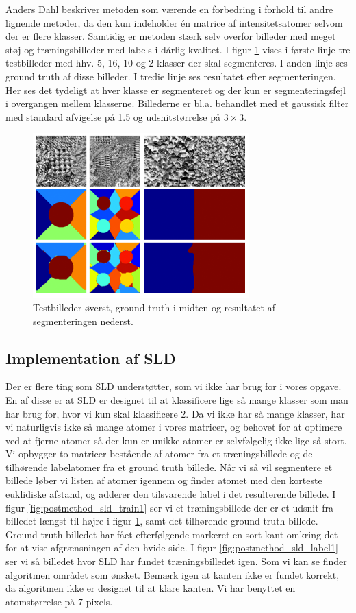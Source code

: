 Anders Dahl beskriver metoden som værende en forbedring i forhold til andre lignende metoder, da den kun indeholder én matrice af intensitetsatomer selvom der er flere klasser. Samtidig er metoden stærk selv overfor billeder med meget støj og træningsbilleder med labels i dårlig kvalitet. I figur \ref{fig:postmethod_sld_testing} vises i første linje tre testbilleder med hhv. 5, 16, 10 og 2 klasser der skal segmenteres. I anden linje ses ground truth af disse billeder. I tredie linje ses resultatet efter segmenteringen. Her ses det tydeligt at hver klasse er segmenteret og der kun er segmenteringsfejl i overgangen mellem klasserne. Billederne er bl.a. behandlet med et gaussisk filter med standard afvigelse på 1.5 og udsnitstørrelse på $3\times3$.

\begin{figure}[H]
		\centering
		\includegraphics[scale=1]{files/postmethod/img/dict_6.png}
	\caption{Testbilleder øverst, ground truth i midten og resultatet af segmenteringen nederst\cite{sld}.\label{fig:postmethod_sld_testing}}
\end{figure}

\subsection{Implementation af SLD}
Der er flere ting som SLD understøtter, som vi ikke har brug for i vores opgave. En af disse er at SLD er designet til at klassificere lige så mange klasser som man har brug for, hvor vi kun skal klassificere 2. Da vi ikke har så mange klasser, har vi naturligvis ikke så mange atomer i vores matricer, og behovet for at optimere ved at fjerne atomer så der kun er unikke atomer er selvfølgelig ikke lige så stort. Vi opbygger to matricer bestående af atomer fra et træningsbillede og de tilhørende labelatomer fra et ground truth billede. Når vi så vil segmentere et billede løber vi listen af atomer igennem og finder atomet med den korteste euklidiske afstand, og adderer den tilsvarende label i det resulterende billede. I figur \ref{fig:postmethod_sld_train1} ser vi et træningsbillede der er et udsnit fra billedet længst til højre i figur \ref{fig:postmethod_sld_testing}, samt det tilhørende ground truth billede. Ground truth-billedet har fået efterfølgende markeret en sort kant omkring det for at vise afgrænsningen af den hvide side. I figur \ref{fig:postmethod_sld_label1} ser vi så billedet hvor SLD har fundet træningsbilledet igen. Som vi kan se finder algoritmen området som ønsket. Bemærk igen at kanten ikke er fundet korrekt, da algoritmen ikke er designet til at klare kanten. %
Vi har benyttet en atomstørrelse på 7 pixels. %

